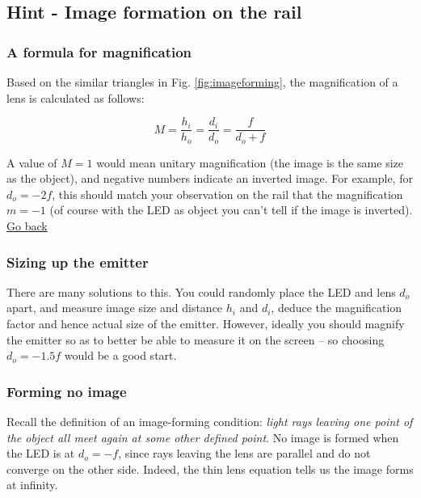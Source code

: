 \documentclass[a4paper]{report}
\begin{document}
    \clearpage
    
    \subsection{Hint - Image formation on the rail}
	\hypertarget{hintTo-image}{}

    \subsubsection{A formula for magnification}
	Based on the similar triangles in Fig. \ref{fig:imageforming}, the magnification of a lens is calculated as follows:
	
	\begin{equation}
	M = \frac{h_i}{h_o} = \frac{d_i}{d_o} = \frac{f}{d_o+f}
	\label{eq:mag}
	\end{equation}
	
	A value of $M=1$ would mean unitary magnification (the image is the same size as the object), and negative numbers indicate an inverted image. For example, for $d_o=-2f$, this should match your observation on the rail that the magnification $m=-1$ (of course with the LED as object you can't tell if the image is inverted).
	\\
	\hyperlink{hintBack-image}{Go back}
	
	\subsubsection{Sizing up the emitter}
	There are many solutions to this. You could randomly place the LED and lens $d_o$ apart, and measure image size and distance $h_i$ and $d_i$, deduce the magnification factor and hence actual size of the emitter. However, ideally you should magnify the emitter so as to better be able to measure it on the screen -- so choosing $d_o=-1.5f$ would be a good start.


	
	\subsubsection{Forming no image}
	Recall the definition of an image-forming condition: \emph{light rays leaving one point of the object all meet again at some other defined point}. No image is formed when the LED is at $d_o=-f$, since rays leaving the lens are parallel and do not converge on the other side. Indeed, the thin lens equation tells us the image forms at infinity.
\end{document}

